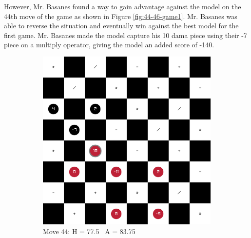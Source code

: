 However, Mr. Basanes found a way to gain advantage against the model on the 44th move of the game as shown in Figure \ref{fig:44-46-game1}. Mr. Basanes was able to reverse the situation and eventually win against the best model for the first game. Mr. Basanes made the model capture his 10 dama piece using their -7 piece on a multiply operator, giving the model an added score of -140.

\begin{figure}[H]
    \centering
    \begin{subfigure}{0.3\textwidth}
        \centering
        \includegraphics[width=\textwidth]{images/games/game1/move_45.png}
        \caption*{Move 44: H = 77.5 \textbar\ A = 83.75}
    \end{subfigure}
    \quad
    \begin{subfigure}{0.3\textwidth}
        \centering

\end{subfigure}
\end{figure}
